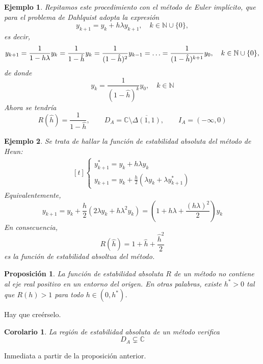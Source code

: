 \documentclass[11pt]{report}
\makeatletter
\renewenvironment{proof}[1][\proofname]{\par
  \pushQED{\qed}%
  \normalfont \topsep\z@skip %
  \trivlist
  \item[\hskip\labelsep
        \itshape
    #1\@addpunct{.}]\ignorespaces
}{%
  \popQED\endtrivlist\@endpefalse
}
\theoremstyle{mytheorem}
\newtheorem{proposition}{Proposición}
\newtheorem{corollary}{Corolario} %
\theoremstyle{mydefinition}
\theoremstyle{myexample}
\newtheorem*{example}{Ejemplo}
\let\oldproofname=\proofname
\renewcommand{\proofname}{\rm\bf{\oldproofname}}}
\newenvironment{cproposition} %
  {\begin{mdframed}[
        linewidth=3pt,
        linecolor=c2,
        bottomline=false,
        topline=false,
        rightline=false,
        innerrightmargin=0pt,
        innertopmargin=0pt,
        innerbottommargin=0pt,
        innerleftmargin=1em, %
        skipabove=\baselineskip]
    \begin{proposition}}
  {\end{proposition}\end{mdframed}}
\newenvironment{ccorollary} %
  {\begin{mdframed}[
        linewidth=3pt,
        linecolor=c2,
        bottomline=false,
        topline=false,
        rightline=false,
        innerrightmargin=0pt,
        innertopmargin=0pt,
        innerbottommargin=0pt,
        innerleftmargin=1em, %
        skipabove=\baselineskip]
    \begin{corollary}}
  {\end{corollary}\end{mdframed}}
\newcommand{\N}{\mathbb N}
\newcommand{\C}{\mathbb C}
\makeatother
\begin{document}
\begin{example}
Repitamos este procedimiento con el método de Euler implícito, que para el problema de Dahlquist adopta la expresión
\[y_{k+1}=y_k+h\lambda y_{k+1}, \quad k \in \N \cup \{0\},\]
es decir,
\[y_{k+ 1} = \frac{1}{1-h\lambda}y_k = \frac{1}{1-\hat{h}}y_k = \frac{1}{(1-\hat{h})^2}y_{k-1} = \mathellipsis = \frac{1}{(1-\hat{h})^{k+1}}y_0, \quad k \in \N \cup \{0\},\]
de donde
\[y_k = \frac{1}{(1-\hat{h})^k}y_0, \quad k \in \N\]
Ahora se tendría
\[R(\hat{h}) = \frac{1}{1-\hat{h}}, \qquad D_A = \C \setminus \overline{\Delta(1,1)}, \qquad I_A = (-\infty,0)\]
\end{example}

\begin{example}
Se trata de hallar la función de estabilidad absoluta del método de Heun:
\[\begin{aligned}[t]
\begin{cases}
        y_{k+1}^* = y_k+h\lambda y_k \\[5pt]
        \displaystyle y_{k+1} = y_k+\frac{h}{2}(\lambda y_k+\lambda y_{k+1}^*)
\end{cases}
\end{aligned}\]
Equivalentemente,
\[y_{k+1} = y_k+\frac{h}{2}(2\lambda y_k+h\lambda^2y_k) = \left(1+h\lambda+\frac{(h\lambda)^2}{2}\right)y_k\]
En consecuencia,
\[R(\hat{h}) = 1+\hat{h}+\frac{\hat{h}^2}{2}\]
es la función de estabilidad absoltua del método.
\end{example}

\begin{cproposition}
La función de estabilidad absoluta $R$ de un método no contiene al eje real positivo en un entorno del origen. En otras palabras, existe $h^*>0$ tal que $R(h)>1$ para todo $h \in (0,h^*)$.
\end{cproposition}

\begin{proof}
Hay que creérselo.
\end{proof}

\begin{ccorollary}
La región de estabilidad absoluta de un método verifica \[D_A \subsetneq \C\]
\end{ccorollary}

\begin{proof}
    Inmediata a partir de la proposición anterior.
\end{proof}
\end{document}
